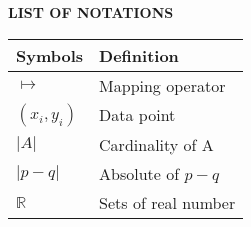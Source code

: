 \begin{center}  
\normalfont\LARGE\textbf{LIST OF NOTATIONS}
\end{center}
\begin{longtable}{|p{2.5cm}|p{11.5cm}|}\hline
	\rowcolor{orange!25}\textbf{Symbols} & \textbf{Definition}\\
	\hline \endhead \hline
	$\mapsto$ & Mapping operator\\ \hline
	$(x_i,y_i)$ & Data point\\ \hline
	$|A|$ & Cardinality of A\\ \hline
	$|p-q|$ & Absolute of $p-q$\\ \hline	
	$\mathbb{R}$ & Sets of real number\\ \hline	
\end{longtable}